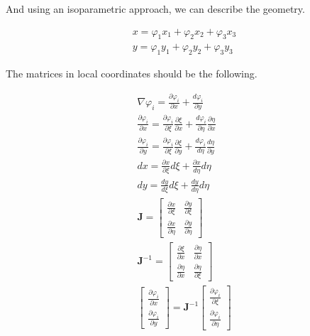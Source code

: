 \documentclass{article}
\begin{document}
And using an isoparametric approach, we can describe the geometry.

\begin{equation}\label{eq:x_t}
    \begin{gathered}
        x=\varphi_1x_1+\varphi_2x_2+\varphi_3x_3\\
        y=\varphi_1y_1+\varphi_2y_2+\varphi_3y_3
    \end{gathered}
\end{equation}

The matrices in local coordinates should be the following.

\begin{equation}\label{eq:2D_Poisson_Sys}
    \begin{gathered}
        \nabla \varphi_i=\frac{\partial\varphi_i}{\partial x}+\frac{d\varphi_i}{\partial y}\\
        \frac{\partial \varphi_i}{\partial x}=\frac{\partial\varphi_i}{\partial\xi}\frac{\partial\xi}{\partial x}+\frac{d\varphi_i}{\partial\eta}\frac{\partial\eta}{\partial x}\\
        \frac{\partial\varphi_i}{\partial y}=\frac{\partial\varphi_i}{\partial\xi}\frac{\partial\xi}{\partial y}+\frac{d\varphi_i}{d\eta}\frac{d\eta}{\partial y}\\
        dx=\frac{\partial x}{\partial\xi}d\xi+\frac{\partial x}{d\eta}d\eta\\
        dy=\frac{dy}{d\xi}d\xi+\frac{dy}{d\eta}d\eta\\
        \textbf{J}=\begin{bmatrix}
            \frac{\partial x}{\partial \xi} & \frac{\partial y}{\partial \xi}\\
            \frac{\partial x}{\partial \eta} & \frac{\partial y}{\partial \eta}
        \end{bmatrix}\\
        \textbf{J}^{-1}=\begin{bmatrix}
            \frac{\partial \xi}{\partial x} & \frac{\partial \eta}{\partial x}\\
            \frac{\partial \eta}{\partial x} & \frac{\partial \eta}{\partial \xi}
        \end{bmatrix}\\
        \begin{bmatrix}
            \frac{\partial \varphi_i}{\partial x}\\
            \frac{\partial \varphi_i}{\partial y}
        \end{bmatrix}
        =\textbf{J}^{-1}\begin{bmatrix}
            \frac{\partial \varphi_i}{\partial \xi}\\
            \frac{\partial \varphi_i}{\partial \eta}
        \end{bmatrix} \\
    \end{gathered}
\end{equation}
\end{document}
